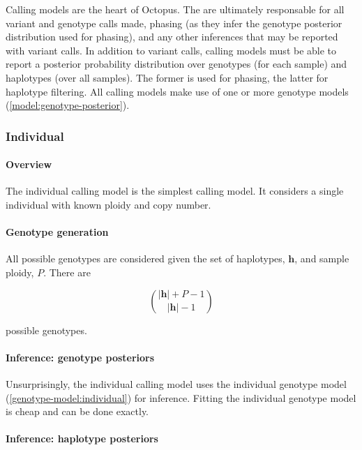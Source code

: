 \documentclass{article}
\begin{document}
Calling models are the heart of Octopus. The are ultimately responsable for all variant and genotype calls made, phasing (as they infer the genotype posterior distribution used for phasing), and any other inferences that may be reported with variant calls. In addition to variant calls, calling models must be able to report a posterior probability distribution over genotypes (for each sample) and haplotypes (over all samples). The former is used for phasing, the latter for haplotype filtering. All calling models make use of one or more genotype models (\ref{model:genotype-posterior}).

\subsubsection{Individual}\label{caller:individual}

\paragraph{Overview}

The individual calling model is the simplest calling model. It considers a single individual with known ploidy and copy number.

\paragraph{Genotype generation}

All possible genotypes are considered given the set of haplotypes, $\boldsymbol{h}$, and sample ploidy, $P$. There are

\begin{equation}
\binom{|\boldsymbol{h}| + P - 1}{|\boldsymbol{h}| - 1}
\end{equation}

possible genotypes.

\paragraph{Inference: genotype posteriors}

Unsurprisingly, the individual calling model uses the individual genotype model (\ref{genotype-model:individual}) for inference. Fitting the individual genotype model is cheap and can be done exactly.

\paragraph{Inference: haplotype posteriors}
\end{document}
